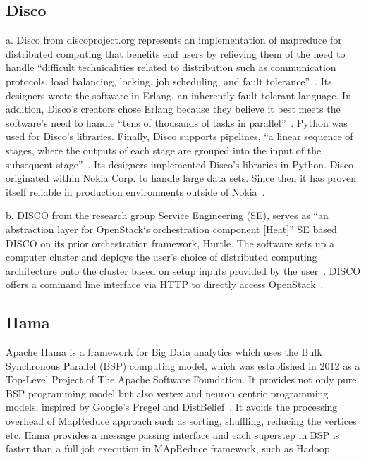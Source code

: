      \pv

     
\subsection{Disco}

a. Disco from discoproject.org represents an implementation of
mapreduce for distributed computing that benefits end users by
relieving them of the need to handle ``difficult technicalities
related to distribution such as communication protocols, load
balancing, locking, job scheduling, and fault
tolerance''~\cite{www-whatis-discoproject}. Its designers wrote the
software in Erlang, an inherently fault tolerant language. In
addition, Disco’s creators chose Erlang because they believe it best
meets the software’s need to handle ``tens of thousands of tasks in
parallel''~\cite{www-erlangprime-discoproject}. Python was used for
Disco’s libraries. Finally, Disco supports pipelines, ``a linear
sequence of stages, where the outputs of each stage are grouped into
the input of the subsequent
stage''~\cite{www-clarridge-discoproject}. Its designers implemented
Disco’s libraries in Python. Disco originated within Nokia Corp. to
handle large data sets.  Since then it has proven itself reliable in
production environments outside of
Nokia~\cite{www-nokia-discoproject}.

b. DISCO from the research group Service Engineering (SE), serves as
``an abstraction layer for OpenStack‘s orchestration component
[Heat]'' SE based DISCO on its prior orchestration framework,
Hurtle. The software sets up a computer cluster and deploys the user’s
choice of distributed computing architecture onto the cluster based on
setup inputs provided by the
user~\cite{www-discoabout-discoabstractionlayer}.  DISCO offers a
command line interface via HTTP to directly access
OpenStack~\cite{www-discodescribed-discoabstractionlayer}.

     \pv

\subsection{Hama}

Apache Hama is a framework for Big Data analytics which uses the Bulk
Synchronous Parallel (BSP) computing model, which was established in
2012 as a Top-Level Project of The Apache Software Foundation. It
provides not only pure BSP programming model but also vertex and
neuron centric programming models, inspired by Google's Pregel and
DistBelief~\cite{apache-hama}. It avoids the processing overhead of
MapReduce approach such as sorting, shuffling, reducing the vertices
etc. Hama provides a message passing interface and each superstep in
BSP is faster than a full job execution in MApReduce framework, such
as Hadoop~\cite{book-hama}.
     
